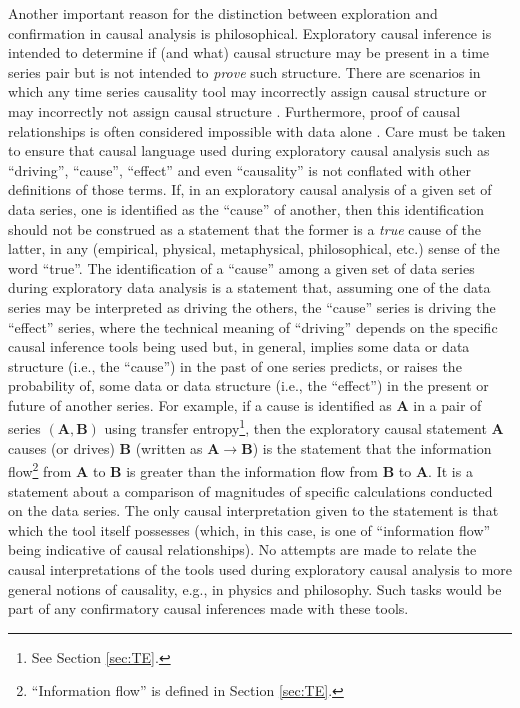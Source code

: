 \documentclass{article}[10pt]
\begin{document}
Another important reason for the distinction between exploration and confirmation in causal analysis is philosophical.  Exploratory causal inference is intended to determine if (and what) causal structure may be present in a time series pair but is not intended to {\em prove} such structure.  There are scenarios in which any time series causality tool may incorrectly assign causal structure or may incorrectly not assign causal structure \cite{Illari2014}.  Furthermore, proof of causal relationships is often considered impossible with data alone \cite{Pearl2000,Illari2014,Imbens2015}.  Care must be taken to ensure that causal language used during exploratory causal analysis such as ``driving'', ``cause'', ``effect'' and even ``causality'' is not conflated with other definitions of those terms.  If, in an exploratory causal analysis of a given set of data series, one is identified as the ``cause'' of another, then this identification should not be construed as a statement that the former is a {\em true} cause of the latter, in any (empirical, physical, metaphysical, philosophical, etc.) sense of the word ``true''.  The identification of a ``cause'' among a given set of data series during exploratory data analysis is a statement that, assuming one of the data series may be interpreted as driving the others, the ``cause'' series is driving the ``effect'' series, where the technical meaning of ``driving'' depends on the specific causal inference tools being used but, in general, implies some data or data structure (i.e., the ``cause'') in the past of one series predicts, or raises the probability of, some data or data structure (i.e., the ``effect'') in the present or future of another series.  For example, if a cause is identified as $\mathbf{A}$ in a pair of series $(\mathbf{A},\mathbf{B})$ using transfer entropy\footnote{See Section \ref{sec:TE}.}, then the exploratory causal statement $\mathbf{A}$ causes (or drives) $\mathbf{B}$ (written as $\mathbf{A}\rightarrow\mathbf{B}$) is the statement that the information flow\footnote{``Information flow'' is defined in Section \ref{sec:TE}.} from $\mathbf{A}$ to $\mathbf{B}$ is greater than the information flow from $\mathbf{B}$ to $\mathbf{A}$.  It is a statement about a comparison of magnitudes of specific calculations conducted on the data series.  The only causal interpretation given to the statement is that which the tool itself possesses (which, in this case, is one of ``information flow'' being indicative of causal relationships).  No attempts are made to relate the causal interpretations of the tools used during exploratory causal analysis to more general notions of causality, e.g., in physics and philosophy.  Such tasks would be part of any confirmatory causal inferences made with these tools.
\end{document}
